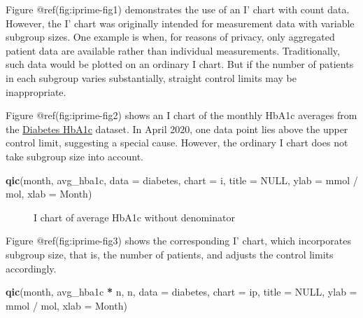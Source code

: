 \documentclass[
]{book}
\makeatletter
\newenvironment{Shaded}{\begin{snugshade}}{\end{snugshade}}
\newcommand{\AttributeTok}[1]{\textcolor[rgb]{0.13,0.29,0.53}{#1}}
\newcommand{\ConstantTok}[1]{\textcolor[rgb]{0.56,0.35,0.01}{#1}}
\newcommand{\FunctionTok}[1]{\textcolor[rgb]{0.13,0.29,0.53}{\textbf{#1}}}
\newcommand{\NormalTok}[1]{#1}
\newcommand{\SpecialCharTok}[1]{\textcolor[rgb]{0.81,0.36,0.00}{\textbf{#1}}}
\newcommand{\StringTok}[1]{\textcolor[rgb]{0.31,0.60,0.02}{#1}}
\newcommand*\pandocbounded[1]{%
  \sbox\pandoc@box{#1}%
  \Gscale@div\@tempa{\textheight}{\dimexpr\ht\pandoc@box+\dp\pandoc@box\relax}%
  \Gscale@div\@tempb{\linewidth}{\wd\pandoc@box}%
  \ifdim\@tempb\p@<\@tempa\p@\let\@tempa\@tempb\fi%
  \ifdim\@tempa\p@<\p@\scalebox{\@tempa}{\usebox\pandoc@box}%
  \else\usebox{\pandoc@box}%
  \fi%
}
\makeatother
\begin{document}
Figure @ref(fig:iprime-fig1) demonstrates the use of an I' chart with
count data. However, the I' chart was originally intended for
measurement data with variable subgroup sizes. One example is when, for
reasons of privacy, only aggregated patient data are available rather
than individual measurements. Traditionally, such data would be plotted
on an ordinary I chart. But if the number of patients in each subgroup
varies substantially, straight control limits may be inappropriate.

Figure @ref(fig:iprime-fig2) shows an I chart of the monthly HbA1c
averages from the \hyperref[diabetes-hba1c]{Diabetes HbA1c} dataset. In
April 2020, one data point lies above the upper control limit,
suggesting a special cause. However, the ordinary I chart does not take
subgroup size into account.

\begin{Shaded}
\begin{Highlighting}[]
\FunctionTok{qic}\NormalTok{(month, avg\_hba1c, }
    \AttributeTok{data  =}\NormalTok{ diabetes, }
    \AttributeTok{chart =} \StringTok{\textquotesingle{}i\textquotesingle{}}\NormalTok{,}
    \AttributeTok{title =} \ConstantTok{NULL}\NormalTok{,}
    \AttributeTok{ylab  =} \StringTok{\textquotesingle{}mmol / mol\textquotesingle{}}\NormalTok{,}
    \AttributeTok{xlab  =} \StringTok{\textquotesingle{}Month\textquotesingle{}}\NormalTok{)}
\end{Highlighting}
\end{Shaded}

\begin{figure}
\centering
\pandocbounded{}
\caption{I chart of average HbA1c without denominator}
\end{figure}

Figure @ref(fig:iprime-fig3) shows the corresponding I' chart, which
incorporates subgroup size, that is, the number of patients, and adjusts
the control limits accordingly.

\begin{Shaded}
\begin{Highlighting}[]
\FunctionTok{qic}\NormalTok{(month, avg\_hba1c }\SpecialCharTok{*}\NormalTok{ n, n, }
    \AttributeTok{data  =}\NormalTok{ diabetes, }
    \AttributeTok{chart =} \StringTok{\textquotesingle{}ip\textquotesingle{}}\NormalTok{,}
    \AttributeTok{title =} \ConstantTok{NULL}\NormalTok{,}
    \AttributeTok{ylab  =} \StringTok{\textquotesingle{}mmol / mol\textquotesingle{}}\NormalTok{,}
    \AttributeTok{xlab  =} \StringTok{\textquotesingle{}Month\textquotesingle{}}\NormalTok{)}
\end{Highlighting}
\end{Shaded}
\end{document}
